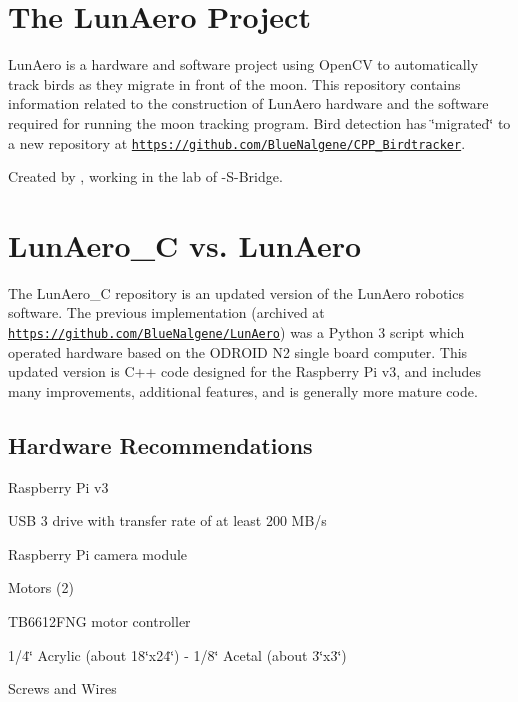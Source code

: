 

\section*{The Lun\+Aero Project}

Lun\+Aero is a hardware and software project using Open\+CV to automatically track birds as they migrate in front of the moon. This repository contains information related to the construction of Lun\+Aero hardware and the software required for running the moon tracking program. Bird detection has \char`\"{}migrated\char`\"{} to a new repository at \href{https://github.com/BlueNalgene/CPP_Birdtracker}{\tt https\+://github.\+com/\+Blue\+Nalgene/\+C\+P\+P\+\_\+\+Birdtracker}.

Created by , working in the lab of -\/\+S-\/\+Bridge.

\section*{Lun\+Aero\+\_\+C vs. Lun\+Aero}

The Lun\+Aero\+\_\+C repository is an updated version of the Lun\+Aero robotics software. The previous implementation (archived at \href{https://github.com/BlueNalgene/LunAero}{\tt https\+://github.\+com/\+Blue\+Nalgene/\+Lun\+Aero}) was a Python 3 script which operated hardware based on the O\+D\+R\+O\+ID N2 single board computer. This updated version is C++ code designed for the Raspberry Pi v3, and includes many improvements, additional features, and is generally more mature code.

\subsection*{Hardware Recommendations}


\begin{DoxyItemize}
\item Raspberry Pi v3
\item U\+SB 3 drive with transfer rate of at least 200 M\+B/s
\item Raspberry Pi camera module
\item Motors (2)
\item T\+B6612\+F\+NG motor controller
\item 1/4\char`\"{} Acrylic (about 18\char`\"{}x24\char`\"{})
-\/ 1/8\char`\"{} Acetal (about 3\char`\"{}x3\char`\"{})
\item Screws and Wires
\end{DoxyItemize}

